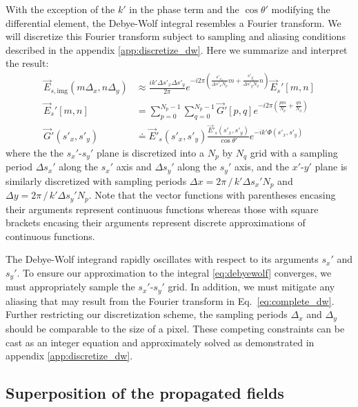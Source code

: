 With the exception of the $k'$ in the phase term and the $\cos{\theta'}$ 
modifying the differential element, the
Debye-Wolf integral resembles a Fourier transform. We will discretize this
Fourier transform subject to sampling and aliasing conditions described
in the appendix \ref{app:discretize_dw}. Here we summarize and interpret the result:
\begin{equation}
  \begin{split}
    \vec{E}_{s,\text{img}}( m \Delta_x, n \Delta_y) & \approx \frac{i k' \Delta s'_x \Delta s'_y}{2 \pi} e^{-i2\pi \left ( \frac{s'_{x_o}}{\Delta s'_x N_p} m + \frac{s'_{y_o}}{\Delta s'_yN_q} n \right ) } \vec{E}_s'\left [ m, n \right ] \\
    \vec{E}_s'\left [ m,n \right ] & = \sum_{p=0}^{N_p-1}\sum_{q=0}^{N_p-1}\vec{G}'\left [p,q\right ] e^{-i2\pi \left ( \frac{pm}{N_p}+\frac{qn}{N_q} \right ) } \\
    \vec{G}'(s'_x,s'_y) & \doteq \vec{E}'_s(s'_x,s'_y)\frac{\vec{E}'_s(s'_x,s'_y)}{\cos{\theta'}}e^{-ik'\Phi(s'_x,s'_y)}
  \end{split}
  \label{eq:complete_dw}
\end{equation}
where the the $s_x'$-$s_y'$ plane is discretized into a
$N_p$ by $N_q$ grid with a sampling period $\Delta s_x'$ along the $s_x'$ axis and
$\Delta s_y'$ along the $s_y'$ axis, and the $x'$-$y'$ plane is similarly discretized with
sampling periods $\Delta x = 2\pi \, / \, k' \Delta s_x' N_p$ and $\Delta y = 2\pi \, / \, k' \Delta s_y' N_p$.
Note that the vector functions with parentheses encasing their arguments represent
continuous functions whereas those with square brackets encasing their arguments represent
discrete approximations of continuous functions.

The Debye-Wolf integrand rapidly oscillates with respect to its arguments $s_x'$ and $s_y'$.
To ensure our approximation to the integral \eqref{eq:debyewolf} converges, we
must appropriately sample the $s_x'$-$s_y'$ grid. In addition, we must mitigate any
aliasing that may result from the Fourier transform in Eq.~\eqref{eq:complete_dw}.
Further restricting our discretization scheme, the sampling periods $\Delta_x$
and $\Delta_y$ should be comparable to the size of a pixel. These competing constraints
can be cast as an integer equation and approximately solved as demonstrated
in appendix \ref{app:discretize_dw}.

\subsection{Superposition of the propagated fields}

